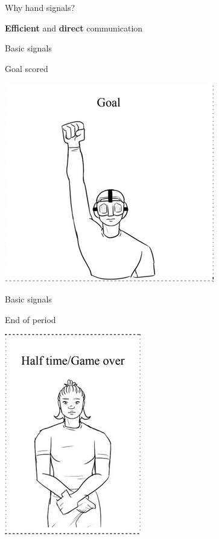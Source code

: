 \documentclass{beamer}
\begin{document}
    \begin{frame}{Why hand signals?}
        \begin{center}
            \textbf{Efficient} and \textbf{direct} communication
        \end{center}
    \end{frame}

    \begin{frame}{Basic signals}
        \begin{center}
            Goal scored

            \vspace{0.5cm}

            \includegraphics[scale=0.8]{goalScoredSignal}
        \end{center}
    \end{frame}

    \begin{frame}{Basic signals}
        \begin{center}
            End of period

            \vspace{0.5cm}

            \includegraphics[scale=0.8]{endOfPeriodSignal}
        \end{center}
    \end{frame}
\end{document}
